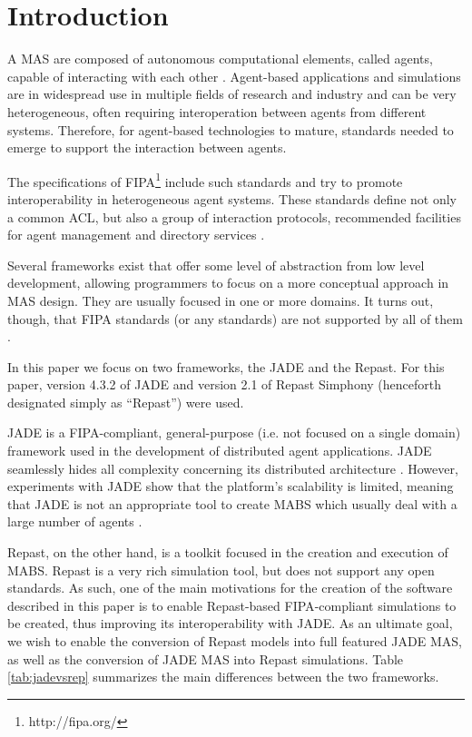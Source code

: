 \section{Introduction} %
\label{sec:introduction}

A \gls{MAS} are composed of autonomous computational elements, called agents, capable of interacting with each other \cite{wooldridge2008introduction}.
Agent-based applications and simulations are in widespread use in multiple fields of research and industry and can be very heterogeneous, often requiring interoperation between agents from different systems.
Therefore, for agent-based technologies to mature, standards needed to emerge to support the interaction between agents.

The specifications of \gls{FIPA}\footnote{http://fipa.org/} include such standards and try to promote interoperability in heterogeneous agent systems.
These standards define not only a common \gls{ACL}, but also a group of interaction protocols, recommended facilities for agent management and directory services \cite{o1998fipa}.

Several frameworks exist that offer some level of abstraction from low level development, allowing programmers to focus on a more conceptual approach in \gls{MAS} design.
They are usually focused in one or more domains.
It turns out, though, that \gls{FIPA} standards (or any standards) are not supported by all of them \cite{survey}.

In this paper we focus on two frameworks, the \gls{JADE} and the \gls{Repast}. For this paper, version 4.3.2 of JADE and version 2.1 of Repast Simphony (henceforth designated simply as ``Repast'') were used.

\gls{JADE} is a \gls{FIPA}-compliant, general-purpose (i.e. not focused on a single domain) framework used in the development of distributed agent applications.
\gls{JADE} seamlessly hides all complexity concerning its distributed architecture \cite{bellifemine2003JADE}.
However, experiments with \gls{JADE} show that the platform's scalability is limited, meaning that \gls{JADE} is not an appropriate tool to create MABS which usually deal with a large number of agents \cite{mengistu2008scalability} \cite{garcia2011misia}.

Repast, on the other hand, is a toolkit focused in the creation and execution of \gls{MABS}. Repast \cite{repSimph} is a very rich simulation tool, but does not support any open standards. As such, one of the main motivations for the creation of the software described in this paper is to enable Repast-based \gls{FIPA}-compliant simulations to be created, thus improving its interoperability with \gls{JADE}. As an ultimate goal, we wish to enable the conversion of Repast models into full featured \gls{JADE} MAS, as well as the conversion of \gls{JADE} MAS into Repast simulations. Table \ref{tab:jadevsrep} summarizes the main differences between the two frameworks.

